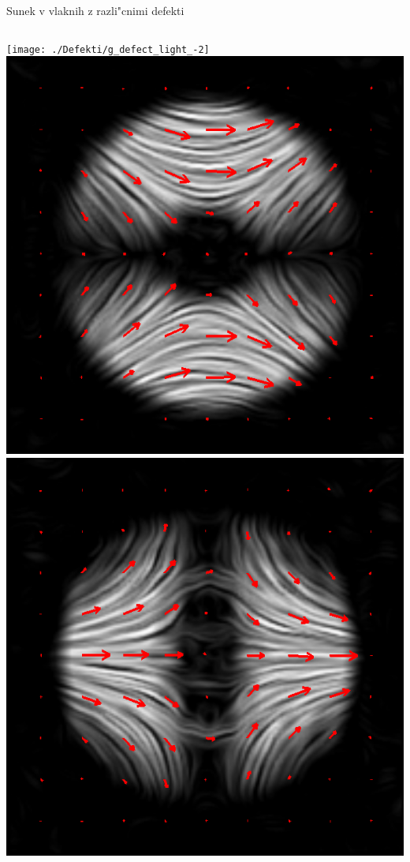 \documentclass{beamer}
\begin{document}
\begin{frame}{Sunek v vlaknih z razli"cnimi defekti}

\begin{columns}

  \centering
  \texttt{[image: ./Defekti/g\_defect\_light\_-2]} \\[2mm]
  \includegraphics[width=\textwidth]{./Slike/licp_m1_74} \\[2mm]
  \includegraphics[width=\textwidth]{./Slike/licp_m1_82}
    

\end{columns}
\end{frame}
\end{document}

